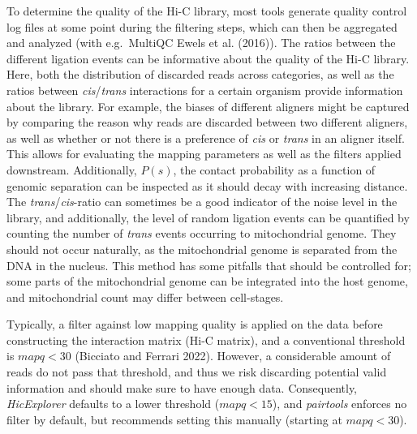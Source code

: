 \documentclass[
  11pt,
  a4paper,
]{scrbook}
\begin{document}
To determine the quality of the Hi-C library, most tools generate
quality control log files at some point during the filtering steps,
which can then be aggregated and analyzed (with e.g.~MultiQC Ewels et
al. (2016)). The ratios between the different ligation events can be
informative about the quality of the Hi-C library. Here, both the
distribution of discarded reads across categories, as well as the ratios
between \emph{cis}/\emph{trans} interactions for a certain organism
provide information about the library. For example, the biases of
different aligners might be captured by comparing the reason why reads
are discarded between two different aligners, as well as whether or not
there is a preference of \emph{cis} or \emph{trans} in an aligner
itself. This allows for evaluating the mapping parameters as well as the
filters applied downstream. Additionally, \(P(s)\), the contact
probability as a function of genomic separation can be inspected as it
should decay with increasing distance. The \emph{trans}/\emph{cis}-ratio
can sometimes be a good indicator of the noise level in the library, and
additionally, the level of random ligation events can be quantified by
counting the number of \emph{trans} events occurring to mitochondrial
genome. They should not occur naturally, as the mitochondrial genome is
separated from the DNA in the nucleus. This method has some pitfalls
that should be controlled for; some parts of the mitochondrial genome
can be integrated into the host genome, and mitochondrial count may
differ between cell-stages.

Typically, a filter against low mapping quality is applied on the data
before constructing the interaction matrix (Hi-C matrix), and a
conventional threshold is \(mapq < 30\) (Bicciato and Ferrari 2022).
However, a considerable amount of reads do not pass that threshold, and
thus we risk discarding potential valid information and should make sure
to have enough data. Consequently, \emph{HicExplorer} defaults to a
lower threshold (\(mapq < 15\)), and \emph{pairtools} enforces no filter
by default, but recommends setting this manually (starting at
\(mapq < 30\)).
\end{document}
